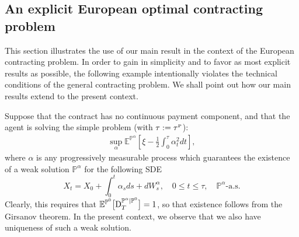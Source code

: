 \documentclass[11pt,a4paper]{article}
\numberwithin{equation}{section}
\def\dbE{\mathbb{E}}
\def\dbP{\mathbb{P}}
\newcommand{\cF}{\mathcal{F}}
\theoremstyle{definition}
\begin{document}
\subsection{An explicit European optimal contracting problem}

This section illustrates the use of our main result in the context of the European contracting problem. 
In order to gain in simplicity and to favor as most explicit results as possible, the following example intentionally violates the technical conditions of the general contracting problem. 
We shall point out how our main results extend to the present context.

Suppose that the contract has no continuous payment component, and that the agent is solving the simple problem (with $\tau:=\tau^{\scriptscriptstyle\rm P}$):
 \begin{align*}
   \sup_{\alpha} \dbE^{\dbP^\alpha}\left[\xi-\frac12\int_0^\tau \alpha_t^2 dt\right],
 \end{align*}
 where $\alpha$ is any progressively measurable process which guarantees the existence of a weak solution $\dbP^\alpha$ for the following SDE
  $$ X_t=X_0+\int_0^t \alpha_sds+dW_s^{\alpha},  \quad 0\leq t \leq\tau, \quad \dbP^\alpha\mbox{-a.s.} $$
Clearly, this requires that $\dbE^{\dbP^0}\big[{\rm D}^{\dbP^\alpha |\dbP^0}_T\big]=1$, so that existence follows from the Girsanov theorem. In the present context, we observe that we also have uniqueness of such a weak solution.

% 
%
\end{document}
